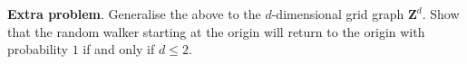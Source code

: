 \documentclass[11pt,fleqn]{book} %
\begin{document}
\begin{problem}
  \textbf{Extra problem}. Generalise the above to the $d$-dimensional grid graph $\mathbf{Z}^d$. Show that the random walker starting at the origin will return to the origin with probability $1$ if and only if $d \le 2$.
\end{problem}



  
  
\end{document}
